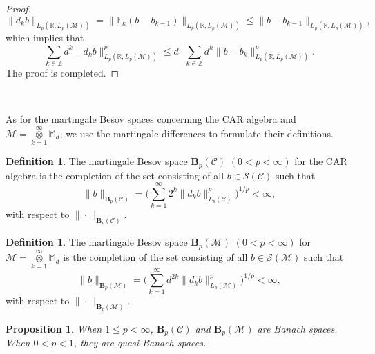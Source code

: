 \documentclass[oneside,english,a4wide]{amsart}
\numberwithin{equation}{section}
\numberwithin{figure}{section}
\theoremstyle{plain}
\theoremstyle{plain}
\newtheorem{proposition}[thm]{Proposition}
\theoremstyle{definition}
\theoremstyle{plain}
\theoremstyle{remark}
\theoremstyle{definition}
\newtheorem{definition}[thm]{Definition}
\theoremstyle{remark}
\theoremstyle{definition}
\newcommand{\8}{\infty}
\begin{document}
\begin{proof}
	\begin{equation*}
		\|d_kb\|_{L_p(\mathbb{R},L_p(\mathcal{M}))}=\|\mathbb{E}_k(b-b_{k-1})\|_{L_p(\mathbb{R},L_p(\mathcal{M}))}\le \|b-b_{k-1}\|_{L_p(\mathbb{R},L_p(\mathcal{M}))},
	\end{equation*}
	which implies that
	\begin{equation*}
		\sum_{k\in\mathbb{Z}} d^k \|d_kb\|^p_{L_p(\mathbb{R},L_p(\mathcal{M}))} \le d\cdot\sum_{k\in\mathbb{Z}} d^k \|b-b_k\|^p_{L_p(\mathbb{R},L_p(\mathcal{M}))}.
	\end{equation*}
	The proof is completed.
\end{proof}
	
\

As for the martingale Besov spaces concerning the CAR algebra and $\mathscr{M}=\mathop{\otimes}\limits_{k=1}^{\infty}\mathbb{M}_{d}$, we use the martingale differences to formulate their definitions.

\begin{definition}\label{mbs2}
	The martingale Besov space $\pmb{B}_p(\mathcal{C})$ $(0<p<\8)$ for the CAR algebra is the completion of the set consisting of all $b\in \mathcal{S}(\mathcal{C})$ such that
	\begin{equation*}
		\|b\|_{\pmb{B}_p(\mathcal{C})}=\biggl(\sum_{k=1}^\infty2^{k}\|d_kb\|^p_{L_p(\mathcal{C})}\biggr)^{1/p}<\infty,
	\end{equation*}
	with respect to $ \|\cdot \|_{\pmb{B}_p(\mathcal{C})} $.
\end{definition}
\begin{definition}\label{mbs3}
	The martingale Besov space $\pmb{B}_p(\mathscr{M})$ $(0<p<\8)$ for $\mathscr{M}=\mathop{\otimes}\limits_{k=1}^{\infty}\mathbb{M}_{d}$ is the completion of the set consisting of all $b\in \mathcal{S}(\mathscr{M})$ such that
	\begin{equation*}
		\|b\|_{\pmb{B}_p(\mathscr{M})}=\biggl(\sum_{k=1}^\infty d^{2k}\|d_kb\|^p_{L_p(\mathscr{M})}\biggr)^{1/p}<\infty,
	\end{equation*}
	with respect to $ \|\cdot \|_{\pmb{B}_p(\mathscr{M})} $.
\end{definition}
\begin{proposition}\label{prop2.180}
	When $1\leq p<\8$, $\pmb{B}_p(\mathcal{C})$ and $\pmb{B}_p(\mathscr{M})$ are Banach spaces. When $0<p<1$,  they are quasi-Banach spaces.
\end{proposition}
\end{document}
